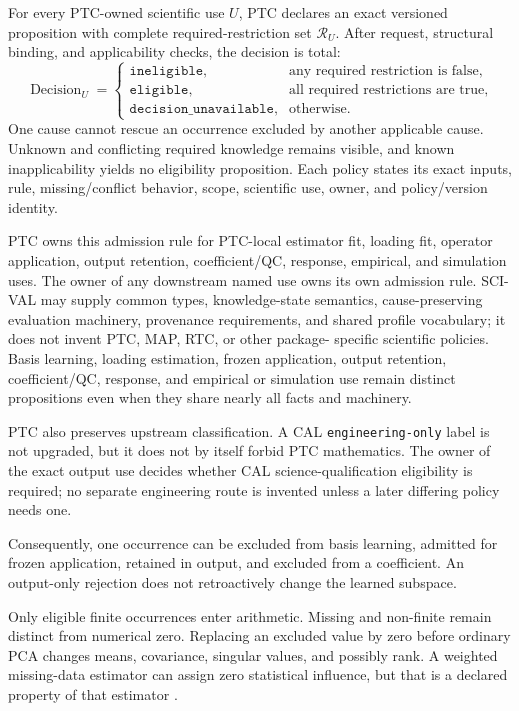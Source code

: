\documentclass[11pt]{article}
\begin{document}
For every PTC-owned scientific use $U$, PTC declares an exact versioned
proposition with complete required-restriction set $\mathcal R_U$. After
request, structural binding, and applicability checks, the decision is total:
\[
\operatorname{Decision}_U=
\begin{cases}
\texttt{ineligible},&\text{any required restriction is false},\\
\texttt{eligible},&\text{all required restrictions are true},\\
\texttt{decision\_unavailable},&\text{otherwise}.
\end{cases}
\]
One cause cannot rescue an occurrence excluded by another applicable cause.
Unknown and conflicting required knowledge remains visible, and known
inapplicability yields no eligibility proposition. Each policy
states its exact inputs, rule, missing/conflict behavior, scope,
scientific use, owner, and policy/version identity.

PTC owns this admission rule for PTC-local estimator fit, loading fit,
operator application, output retention, coefficient/QC, response, empirical,
and simulation uses. The owner of any downstream named use owns its own
admission rule. SCI-VAL may supply common types, knowledge-state semantics,
cause-preserving evaluation machinery, provenance requirements, and shared
profile vocabulary; it does not invent PTC, MAP, RTC, or other package-
specific scientific policies. Basis learning, loading estimation, frozen
application, output retention, coefficient/QC, response, and empirical or
simulation use remain distinct propositions even when they share nearly all
facts and machinery.

PTC also preserves upstream classification. A CAL
\texttt{engineering-only} label is not upgraded, but it does not by itself
forbid PTC mathematics. The owner of the exact output use decides whether
CAL science-qualification eligibility is required; no separate engineering route is
invented unless a later differing policy needs one.

Consequently, one occurrence can be excluded from basis learning, admitted
for frozen application, retained in output, and excluded from a coefficient.
An output-only rejection does not retroactively change the learned subspace.

Only eligible finite occurrences enter arithmetic. Missing and non-finite
remain distinct from numerical zero. Replacing an excluded value by zero
before ordinary PCA changes means, covariance, singular values, and possibly
rank. A weighted missing-data estimator can assign zero statistical influence,
but that is a declared property of that estimator \cite{bailey2012}.
\end{document}

